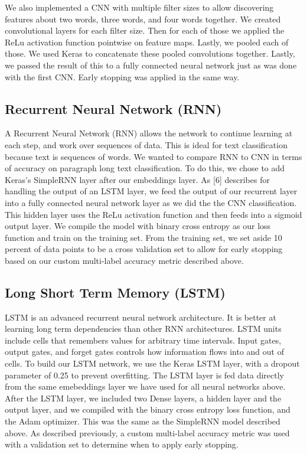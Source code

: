 \documentclass[sigconf]{acmart}
\begin{document}
We also implemented a CNN with multiple filter sizes to allow discovering features about two words, three words, and four words together. We created convolutional layers for each filter size.  Then for each of those we applied the ReLu activation function pointwise on feature maps.  Lastly, we pooled each of those. We used Keras to concatenate these pooled convolutions together.  Lastly, we passed the result of this to a fully connected neural network just as was done with the first CNN. Early stopping was applied in the same way.

\subsection{Recurrent Neural Network (RNN)}
A Recurrent Neural Network (RNN) allows the network to continue learning at each step, and work over sequences of data. This is ideal for text classification because text is sequences of words. We wanted to compare RNN to CNN in terms of accuracy on paragraph long text classification.  To do this, we chose to add Keras's SimpleRNN layer after our embeddings layer. As [6] describes for handling the output of an LSTM layer, we feed the output of our recurrent layer into a fully connected neural network layer as we did the the CNN classification. This hidden layer uses the ReLu activation function and then feeds into a sigmoid output layer. We compile the model with binary cross entropy as our loss function and train on the training set.  From the training set, we set aside 10 percent of data points to be a cross validation set to allow for early stopping based on our custom multi-label accuracy metric described above. 

\subsection{Long Short Term Memory (LSTM)}
LSTM is an advanced recurrent neural network architecture.  It is better at learning long term dependencies than other RNN architectures.  LSTM units include cells that remembers values for arbitrary time intervals. Input gates, output gates, and forget gates controls how information flows into and out of cells. To build our LSTM network, we use the Keras LSTM layer, with a dropout parameter of 0.25 to prevent overfitting. The LSTM layer is fed data directly from the same emebeddings layer we have used for all neural networks above. After the LSTM layer, we included two Dense layers, a hidden layer and the output layer, and we compiled with the binary cross entropy loss function, and the Adam optimizer. This was the same as the SimpleRNN model described above. As described previously, a custom multi-label accuracy metric was used with a validation set to determine when to apply early stopping. 
\end{document}
